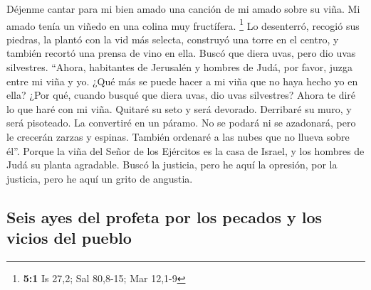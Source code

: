 \begin{paracol}{2}
 Déjenme cantar para mi bien amado una canción de mi amado
sobre su viña. Mi amado tenía un viñedo en una colina muy fructífera.
\footnote{\textbf{5:1} Is 27,2; Sal 80,8-15; Mar 12,1-9} 
Lo desenterró, recogió sus piedras, la plantó con la vid más selecta,
construyó una torre en el centro, y también recortó una prensa de vino
en ella. Buscó que diera uvas, pero dio uvas silvestres. 
``Ahora, habitantes de Jerusalén y hombres de Judá, por favor, juzga
entre mi viña y yo.  ¿Qué más se puede hacer a mi viña que
no haya hecho yo en ella? ¿Por qué, cuando busqué que diera uvas, dio
uvas silvestres?  Ahora te diré lo que haré con mi viña.
Quitaré su seto y será devorado. Derribaré su muro, y será pisoteado.
 La convertiré en un páramo. No se podará ni se azadonará,
pero le crecerán zarzas y espinas. También ordenaré a las nubes que no
llueva sobre él''.  Porque la viña del Señor de los
Ejércitos es la casa de Israel, y los hombres de Judá su planta
agradable. Buscó la justicia, pero he aquí la opresión, por la justicia,
pero he aquí un grito de angustia.

\hypertarget{seis-ayes-del-profeta-por-los-pecados-y-los-vicios-del-pueblo}{%
\subsection{Seis ayes del profeta por los pecados y los vicios del
pueblo}\label{seis-ayes-del-profeta-por-los-pecados-y-los-vicios-del-pueblo}}


\end{paracol}
